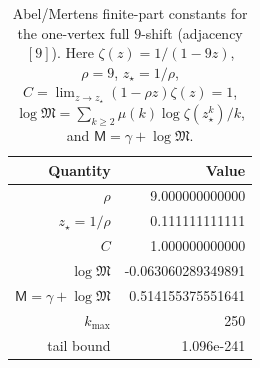\begin{table}[H]
\centering
\scriptsize
\setlength{\tabcolsep}{6pt}
\caption{Abel/Mertens finite-part constants for the one-vertex full $9$-shift (adjacency $[9]$). Here $\zeta(z)=1/(1-9z)$, $\rho=9$, $z_\star=1/\rho$, $C=\lim_{z\to z_\star}(1-\rho z)\zeta(z)=1$, $\log\mathfrak{M}=\sum_{k\ge2}\mu(k)\log\zeta(z_\star^k)/k$, and $\mathsf{M}=\gamma+\log\mathfrak{M}$.}
\label{tab:full_shift_9_finite_part}
\begin{tabular}{r r}
\toprule
Quantity & Value\\
\midrule
$\rho$ & 9.000000000000\\
$z_\star=1/\rho$ & 0.111111111111\\
$C$ & 1.000000000000\\
$\log\mathfrak{M}$ & -0.063060289349891\\
$\mathsf{M}=\gamma+\log\mathfrak{M}$ & 0.514155375551641\\
$k_{\max}$ & 250\\
tail bound & 1.096e-241\\
\bottomrule
\end{tabular}
\end{table}
